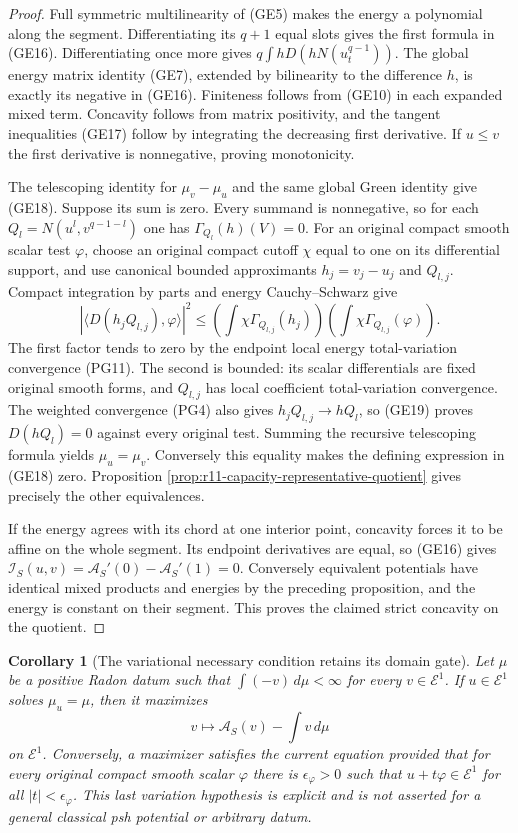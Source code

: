 \documentclass[11pt,a4paper]{article}
\numberwithin{equation}{section}
\newtheorem{corollary}[theorem]{Corollary}
\theoremstyle{definition}
\theoremstyle{remark}
\begin{document}
\begin{proof}
Full symmetric multilinearity of (GE5) makes the energy a
polynomial along the segment. Differentiating its $q+1$
equal slots gives the first formula in (GE16). Differentiating
once more gives
$q\int hD(hN(u_t^{q-1}))$. The global energy matrix identity
(GE7), extended by bilinearity to the difference $h$, is
exactly its negative in (GE16). Finiteness follows from
(GE10) in each expanded mixed term. Concavity follows from
matrix positivity, and the tangent inequalities (GE17) follow
by integrating the decreasing first derivative. If $u\leq v$
the first derivative is nonnegative, proving monotonicity.

The telescoping identity for $\mu_v-\mu_u$ and the same
global Green identity give (GE18). Suppose its sum is zero.
Every summand is nonnegative, so for each
$Q_l=N(u^l,v^{q-1-l})$ one has
$\Gamma_{Q_l}(h)(V)=0$.
For an original compact smooth scalar test $\varphi$, choose
an original compact cutoff $\chi$ equal to one on its
differential support, and use canonical bounded approximants
$h_j=v_j-u_j$ and $Q_{l,j}$. Compact integration by parts
and energy Cauchy--Schwarz give
\[
 |\langle D(h_jQ_{l,j}),\varphi\rangle|^2
       \leq\left(\int\chi\Gamma_{Q_{l,j}}(h_j)\right)
             \left(\int\chi\Gamma_{Q_{l,j}}(\varphi)\right).
 \tag{GE19}
\]
The first factor tends to zero by the endpoint local
energy total-variation convergence (PG11). The second is
bounded: its scalar differentials are fixed original smooth
forms, and $Q_{l,j}$ has local coefficient total-variation
convergence. The weighted convergence (PG4) also gives
$h_jQ_{l,j}\to hQ_l$, so (GE19) proves $D(hQ_l)=0$
against every original test. Summing the recursive telescoping
formula yields $\mu_u=\mu_v$. Conversely this equality
makes the defining expression in (GE18) zero. Proposition
\ref{prop:r11-capacity-representative-quotient} gives precisely
the other equivalences.

If the energy agrees with its chord at one interior point,
concavity forces it to be affine on the whole segment.
Its endpoint derivatives are equal, so (GE16) gives
$\mathscr I_S(u,v)=\mathscr A_S'(0)-\mathscr A_S'(1)=0$.
Conversely equivalent potentials have identical mixed products
and energies by the preceding proposition, and the energy is
constant on their segment. This proves the claimed strict
concavity on the quotient.
\end{proof}

\begin{corollary}[The variational necessary condition retains its domain gate]
\label{cor:r11-variational-necessary-condition}
Let $\mu$ be a positive Radon datum such that
$\int(-v)\,d\mu<\infty$ for every $v\in\mathcal E^1$.
If $u\in\mathcal E^1$ solves $\mu_u=\mu$, then it maximizes
\[
                   v\longmapsto\mathscr A_S(v)-\int v\,d\mu
 \tag{GE20}
\]
on $\mathcal E^1$. Conversely, a maximizer satisfies the
current equation provided that for every original compact
smooth scalar $\varphi$ there is $\epsilon_\varphi>0$
such that $u+t\varphi\in\mathcal E^1$ for all
$|t|<\epsilon_\varphi$. This last variation hypothesis is
explicit and is not asserted for a general classical psh
potential or arbitrary datum.
\end{corollary}
\end{document}
